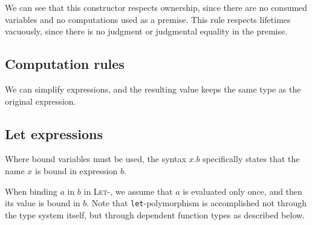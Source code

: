 \documentclass[11pt]{book}
\begin{document}
We can see that this constructor respects ownership, since there are no consumed variables and no computations used as a premise.
This rule respects lifetimes vacuously, since there is no judgment or judgmental equality in the premise.

\subsection{Computation rules}

We can simplify expressions, and the resulting value keeps the same type as the original expression.

\subsection{Let expressions}
Where bound variables must be used, the syntax \( x.b \) specifically states that the name \( x \) is bound in expression \( b \).

When binding \( a \) in \( b \) in \textsc{Let-\rcomp}, we assume that \( a \) is evaluated only once, and then its value is bound in \( b \).
Note that \lstinline{let}-polymorphism is accomplished not through the type system itself, but through dependent function types as described below.
\end{document}
